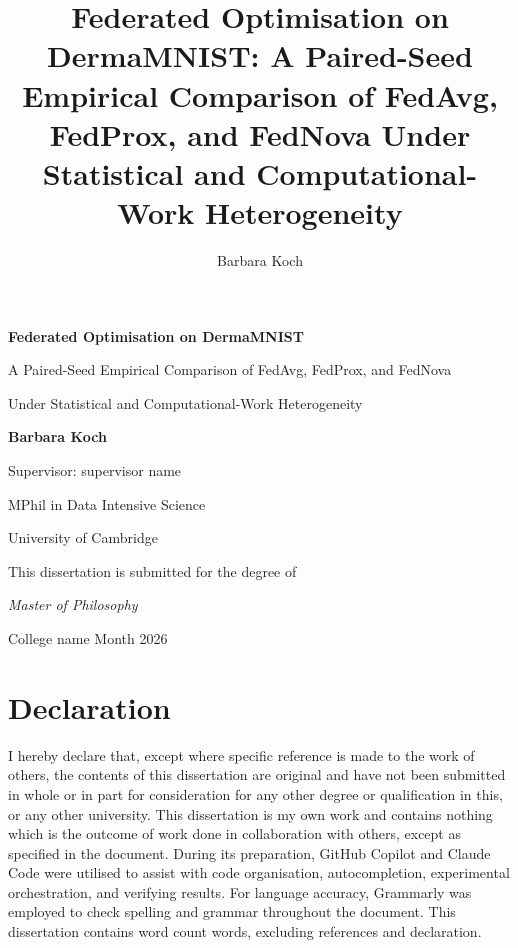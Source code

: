 \documentclass[11pt,a4paper]{report}  %
\title{Federated Optimisation on DermaMNIST: A Paired-Seed Empirical
Comparison of FedAvg, FedProx, and FedNova Under Statistical and
Computational-Work Heterogeneity}
\author{Barbara Koch}
\date{}
\newif\ifshowtodo
\newcommand{\TODOhpc}[1]{%
  \ifshowtodo\textcolor{red}{\textbf{[HPC PENDING: #1]}}\else#1\fi}
\begin{document}
\begin{titlepage}
\centering
\vspace*{3cm}
{\Huge\bfseries Federated Optimisation on DermaMNIST\par}
\vspace{0.5cm}
{\Large A Paired-Seed Empirical Comparison of FedAvg, FedProx, and FedNova\par}
{\Large Under Statistical and Computational-Work Heterogeneity\par}
\vspace{4cm}
\vspace{2cm}
{\large\bfseries Barbara Koch\par}
\vspace{1cm}
{\large Supervisor: \TODOhpc{supervisor name}\par}
{\large MPhil in Data Intensive Science\par}
{\large University of Cambridge\par}
\vspace{3cm}
{This dissertation is submitted for the degree of\par}
{\itshape Master of Philosophy\par}
\vfill
{\large \TODOhpc{College name} \hfill \TODOhpc{Month} 2026 \par}
\end{titlepage}

\chapter*{Declaration}
\thispagestyle{empty}

I hereby declare that, except where specific reference is made to the work of
others, the contents of this dissertation are original and have not been
submitted in whole or in part for consideration for any other degree or
qualification in this, or any other university. This dissertation is my own
work and contains nothing which is the outcome of work done in collaboration
with others, except as specified in the document. During its preparation,
GitHub Copilot and Claude Code were utilised to assist with code organisation,
autocompletion, experimental orchestration, and verifying results. For
language accuracy, Grammarly was employed to check spelling and grammar
throughout the document. This dissertation contains \TODOhpc{word count}
words, excluding references and declaration.
\end{document}
